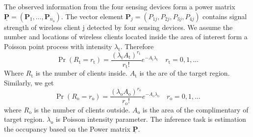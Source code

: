 The observed information from the four sensing devices form a power matrix $\underline{\mathbf{P}} = (\mathbf{P}_1, \ldots, \mathbf{P}_{n_{\mathrm{a}}})$. The vector element $\mathbf{P}_j = (P_{1j}, P_{2j},P_{3j},P_{4j})$ contains signal strength of wireless client j detected by four sensing devices.
We assume the number and locations of wireless clients located inside the area of interest form a Poisson point process with intensity $\lambda_{\mathrm{t}}$. Therefore
\begin{equation*}
\Pr ( R_{\mathrm{t}} = r_{\mathrm{t}} )
= \frac{(\lambda_{\mathrm{t}} A_{\mathrm{t}})^{r_{\mathrm{t}}}}
{r_{\mathrm{t}}!} e^{- A_{\mathrm{t}} \lambda_{\mathrm{t}}}
\quad r_{\mathrm{t}} = 0, 1, \ldots
\end{equation*}
Where $R_{\mathrm{t}}$ is the number of clients inside. $A_{\mathrm{t}}$ is the are of the target region.
Similarly, we get
\begin{equation*}
\Pr ( R_{\mathrm{o}} = r_{\mathrm{o}} )
= \frac{(\lambda_{\mathrm{o}} A_{\mathrm{o}})^{r_{\mathrm{o}}}}
{r_{\mathrm{o}}!} e^{- A_{\mathrm{o}} \lambda_{\mathrm{o}}}
\quad r_{\mathrm{o}} = 0, 1, \ldots
\end{equation*}
where $R_{\mathrm{o}}$ is the number of clients outside. $A_{\mathrm{o}}$ is the area of the complimentary of target region. $\lambda_{\mathrm{o}}$ is Poisson intensity parameter. The inference task is estimation the occupancy based on the Power matrix $\underline{\mathbf{P}}$.
